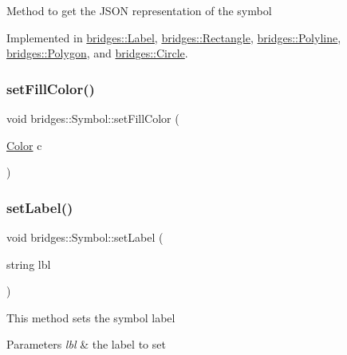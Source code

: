 Method to get the J\+S\+ON representation of the symbol 

Implemented in \mbox{\hyperlink{classbridges_1_1_label_af4bdf9e492cf2a2bf3a8be42bd282b44}{bridges\+::\+Label}}, \mbox{\hyperlink{classbridges_1_1_rectangle_a509c9489c6f145b684447851736acac5}{bridges\+::\+Rectangle}}, \mbox{\hyperlink{classbridges_1_1_polyline_a850d2f619466b159c7874317f9eaf0a3}{bridges\+::\+Polyline}}, \mbox{\hyperlink{classbridges_1_1_polygon_a5c3e3bbeda23db712088278a3c82a0a6}{bridges\+::\+Polygon}}, and \mbox{\hyperlink{classbridges_1_1_circle_aaee59a0d8ad00c75f7547bac2cfabd38}{bridges\+::\+Circle}}.

\mbox{\label{classbridges_1_1_symbol_a20315217d30c3c747b5b6da60c08c2c9}} 
\subsubsection{\texorpdfstring{setFillColor()}{setFillColor()}}
{\footnotesize\ttfamily void bridges\+::\+Symbol\+::set\+Fill\+Color (\begin{DoxyParamCaption}\item[{\mbox{\hyperlink{classbridges_1_1_color}{Color}}}]{c }\end{DoxyParamCaption})\hspace{0.3cm}{\ttfamily [inline]}}

\mbox{\label{classbridges_1_1_symbol_afd181fe1e860542548efc4244e06f609}} 
\subsubsection{\texorpdfstring{setLabel()}{setLabel()}}
{\footnotesize\ttfamily void bridges\+::\+Symbol\+::set\+Label (\begin{DoxyParamCaption}\item[{string}]{lbl }\end{DoxyParamCaption})\hspace{0.3cm}{\ttfamily [inline]}}

This method sets the symbol label


\begin{DoxyParams}{Parameters}
{\em lbl} & the label to set \\
\hline
\end{DoxyParams}
\mbox{\label{classbridges_1_1_symbol_a9a1bdebb8dcec2871243a269e618a351}} 
